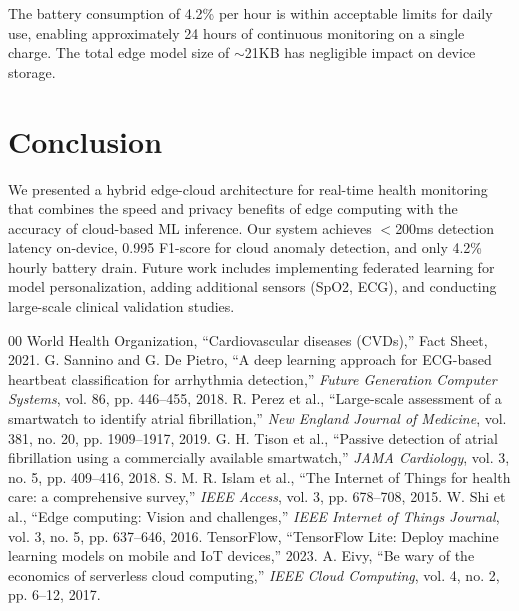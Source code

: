\documentclass[conference]{IEEEtran}
\begin{document}
The battery consumption of 4.2\% per hour is within acceptable limits for daily use, enabling approximately 24 hours of continuous monitoring on a single charge. The total edge model size of $\sim$21KB has negligible impact on device storage.

\section{Conclusion}
We presented a hybrid edge-cloud architecture for real-time health monitoring that combines the speed and privacy benefits of edge computing with the accuracy of cloud-based ML inference. Our system achieves $<$200ms detection latency on-device, 0.995 F1-score for cloud anomaly detection, and only 4.2\% hourly battery drain. Future work includes implementing federated learning for model personalization, adding additional sensors (SpO2, ECG), and conducting large-scale clinical validation studies.

\begin{thebibliography}{00}
 World Health Organization, ``Cardiovascular diseases (CVDs),'' Fact Sheet, 2021.
 G. Sannino and G. De Pietro, ``A deep learning approach for ECG-based heartbeat classification for arrhythmia detection,'' \textit{Future Generation Computer Systems}, vol. 86, pp. 446--455, 2018.
 R. Perez et al., ``Large-scale assessment of a smartwatch to identify atrial fibrillation,'' \textit{New England Journal of Medicine}, vol. 381, no. 20, pp. 1909--1917, 2019.
 G. H. Tison et al., ``Passive detection of atrial fibrillation using a commercially available smartwatch,'' \textit{JAMA Cardiology}, vol. 3, no. 5, pp. 409--416, 2018.
 S. M. R. Islam et al., ``The Internet of Things for health care: a comprehensive survey,'' \textit{IEEE Access}, vol. 3, pp. 678--708, 2015.
 W. Shi et al., ``Edge computing: Vision and challenges,'' \textit{IEEE Internet of Things Journal}, vol. 3, no. 5, pp. 637--646, 2016.
 TensorFlow, ``TensorFlow Lite: Deploy machine learning models on mobile and IoT devices,'' 2023.
 A. Eivy, ``Be wary of the economics of serverless cloud computing,'' \textit{IEEE Cloud Computing}, vol. 4, no. 2, pp. 6--12, 2017.
\end{thebibliography}
\end{document}
